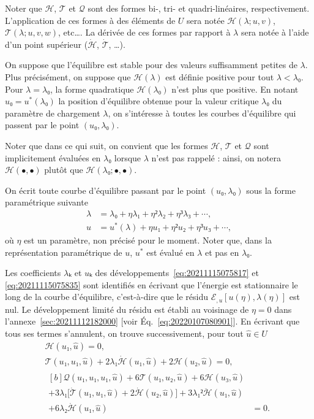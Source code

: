 \documentclass[12pt, final]{amsart}
\begin{document}
Noter que \(ℋ\), \(𝒯\) et \(𝒬\) sont des formes bi-, tri- et quadri-linéaires,
respectivement. L'application de ces formes à des éléments de \(U\) sera notée
\(ℋ(λ; u, v)\), \(𝒯(λ; u, v, w)\), etc\dots. La dérivée de ces formes par
rapport à \(λ\) sera notée à l'aide d'un point supérieur (\(\dot{ℋ}\),
\(\dot{𝒯}\), \dots).

On suppose que l'équilibre est stable pour des valeurs suffisamment petites de
\(λ\). Plus précisément, on suppose que \(ℋ(λ)\) est définie positive pour tout
\(λ<λ₀\). Pour \(λ=λ₀\), la forme quadratique \(ℋ(λ₀)\) n'est plus que
positive. En notant \(u₀=u^*(λ₀)\) la position d'équilibre obtenue pour la
valeur critique \(λ₀\) du paramètre de chargement \(λ\), on s'intéresse à
toutes les courbes d'équilibre qui passent par le point \((u₀, λ₀)\).

Noter que dans ce qui suit, on convient que les formes \(ℋ\), \(𝒯\) et \(𝒬\)
sont implicitement évaluées en \(λ₀\) lorsque \(λ\) n'est pas rappelé : ainsi,
on notera \(ℋ(•, •)\) plutôt que \(ℋ(λ₀; •, •)\).

On écrit toute courbe d'équilibre passant par le point \((u₀, λ₀)\) sous la
forme paramétrique suivante
\begin{align}
  \label{eq:20211115075817}
  λ&=λ₀+ηλ₁+η²λ₂+η³λ₃+\cdots,\\
  \label{eq:20211115075835}
  u&=u^*(λ)+η u₁+η² u₂+η³u₃+\cdots,
\end{align}
où \(η\) est un paramètre, non précisé pour le moment. Noter que, dans la
représentation paramétrique de \(u\), \(u^*\) est évalué en \(λ\) et pas en
\(λ₀\).

Les coefficients \(λ ₖ\) et \(uₖ\) des développements~\eqref{eq:20211115075817}
et \eqref{eq:20211115075835} sont identifiés en écrivant que l'énergie est
stationnaire le long de la courbe d'équilibre, c'est-à-dire que le résidu
\(ℰ_{,u}[u(η), λ(η)]\) est nul. Le développement limité du résidu est établi au
voisinage de \(η=0\) dans l'annexe~\ref{sec:20211112182000} [voir
Éq.~\eqref{eq:20220107080901}]. En écrivant que tous ses termes s'annulent, on
trouve successivement, pour tout \(\hat{u}∈ U\)
\begin{gather}
  \label{eq:20211112182917}
  ℋ(u₁, \hat{u})=0,\\
  \label{eq:20211112183220}
  𝒯(u₁, u₁, \hat{u})+2λ₁\dot{ℋ}(u₁, \hat{u})+2ℋ(u₂, \hat{u})=0,\\
  \begin{aligned}[b]
    𝒬(u₁, u₁, u₁, \hat{u})+6𝒯(u₁, u₂, \hat{u})+6ℋ(u₃, \hat{u})&\\
    +3λ₁\bigl[\dot{𝒯}(u₁, u₁, \hat{u})+2\dot{ℋ}(u₂, \hat{u})\bigr]
    +3λ₁²\ddot{ℋ}(u₁, \hat{u})&\\
    +6λ₂\dot{ℋ}(u₁, \hat{u})&=0.
  \end{aligned}
\end{gather}
\end{document}
